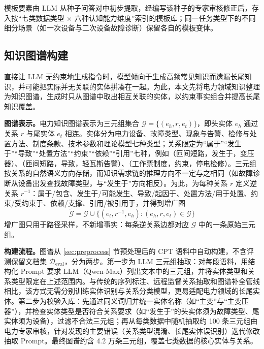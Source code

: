 \documentclass[fontset=fandol,type=master,campus=shenzhen,etitleauto=true]{hithesisbook}
\begin{document}
模板要素由 LLM 从种子问答对中初步提取，经编写该种子的专家审核修正后，存入按“七类数据类型 × 六种认知能力维度”索引的模板库；同一任务类型下的不同细分场景（如一次设备与二次设备故障诊断）保留各自的模板变体。

\subsection{知识图谱构建}\label{ux9762ux5411ux4e03ux7c7bux6570ux636eux7684ux7535ux529bux77e5ux8bc6ux56feux8c31ux6784ux5efa}

直接让 LLM 无约束地生成指令时，模型倾向于生成高频常见知识而遗漏长尾知识，并可能把实际并无关联的实体拼凑在一起。为此，本文先将电力领域知识整理为知识图谱，生成时只从图谱中取出相互关联的实体，以约束事实组合并提高长尾知识覆盖。

\textbf{图谱表示。}电力知识图谱表示为三元组集合 $\mathcal{G} = \{(e_h, r, e_t)\}$，即头实体 $e_h$ 通过关系 $r$ 与尾实体 $e_t$ 相连。实体分为电力设备、故障类型、现象与告警、检修与处置方法、制度条款、技术参数和理论模型七种类型；关系限定为“属于”“发生于”“导致”“处置方法”“约束”“依赖”“引用”七种，例如（匝间短路，发生于，变压器）、（匝间短路，导致，轻瓦斯告警）、（工作票制度，约束，停电检修）。三元组按关系的自然语义方向存储，而知识需求链的推理方向不一定与之相同（如故障诊断从设备出发查找故障类型，与“发生于”方向相反）。为此，为每种关系 $r$ 定义逆关系 $r^{-1}$：属于/包含、发生于/可能发生、导致/起因于、处置方法/用于处置、约束/受约束于、依赖/支撑、引用/被引用于，并得到增广图
\begin{equation}\label{eq:kg-aug}
\tilde{\mathcal{G}} = \mathcal{G} \cup \bigl\{ (e_t, r^{-1}, e_h) : (e_h, r, e_t) \in \mathcal{G} \bigr\}
\end{equation}
增广图只用于路径采样，不新增事实：每条逆关系边都对应 $\mathcal{G}$ 中的一条原始三元组。

\textbf{构建流程。}图谱从 \ref{sec:preprocess} 节预处理后的 CPT 语料中自动构建，不含评测保留文档集 $\mathcal{D}_{\text{eval}}$，分为两步。第一步为 LLM 三元组抽取：对每段语料，用结构化 Prompt 要求 LLM（Qwen-Max）列出文本中的三元组，并将实体类型和关系类型限定在上述范围内。与传统的序列标注、远程监督关系抽取和图谱补全管线\cite{ref70,ref71,ref72,ref73,ref74}相比，该方式无需分别训练实体识别与关系分类模型，更易适配电力领域的长尾实体。第二步为校验入库：先通过同义词归并统一实体名称（如“主变”与“主变压器”），并检查实体类型是否符合关系要求（如“发生于”的头实体须为故障类型、尾实体须为设备），过滤不合法三元组；再从每类数据中随机抽取约 100 条三元组由电力专家审核，针对发现的主要错误（关系类型混淆、长尾实体误识别）迭代修改抽取 Prompt。最终图谱约含 4.2 万条三元组，覆盖七类数据的核心实体与关系。
\end{document}
